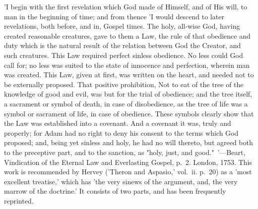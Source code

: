 \documentclass[
]{book}
\begin{document}
{  'I begin with the first revelation which God made of Himself, and of His will, to man in the beginning of time; and from thence 'I would descend to later revelations, both before, and in, Gospel times. The holy, all-wise God, having created reasonable creatures, gave to them a Law, the rule of that obedience and duty which is the natural result of the relation between God the Creator, and such creatures. This Law required perfect sinless obedience. No less could God call for; no less was suited to the state of innocence and perfection, wherein man was created. This Law, given at first, was written on the heart, and needed not to be externally proposed. That positive prohibition, Not to eat of the tree of the knowledge of good and evil, was but for the trial of obedience; and the tree itself, a sacrament or symbol of death, in case of disobedience, as the tree of life was a symbol or sacrament of life, in case of obedience. These symbols clearly show that the Law was established into a covenant. And a covenant it was, truly and properly; for Adam had no right to deny his consent to the terms which God proposed; and, being yet sinless and holy, he had no will thereto, but agreed both to the preceptive part, and to the sanction, as "holy, just, and good."~'---Beart, Vindication of the Eternal Law and Everlasting Gospel, p.~2. London, 1753. This work is recommended by Hervey ('Theron and Aspasio,' vol.~ii. p.~20) as a 'most excellent treatise,' which has 'the very sinews of the argument, and, the very marrow of the doctrine.' It consists of two parts, and has been frequently reprinted.}
\end{document}
